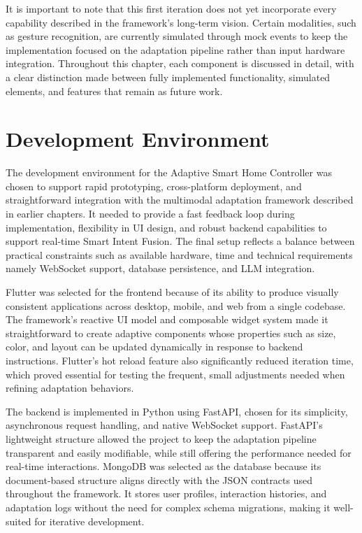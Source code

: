 \documentclass[openany]{book}
\begin{document}
It is important to note that this first iteration does not yet incorporate every capability described in the framework’s long-term vision. Certain modalities, such as gesture recognition, are currently simulated through mock events to keep the implementation focused on the adaptation pipeline rather than input hardware integration. Throughout this chapter, each component is discussed in detail, with a clear distinction made between fully implemented functionality, simulated elements, and features that remain as future work.

\section{Development Environment}
The development environment for the Adaptive Smart Home Controller was chosen to support rapid prototyping, cross-platform deployment, and straightforward integration with the multimodal adaptation framework described in earlier chapters. It needed to provide a fast feedback loop during implementation, flexibility in UI design, and robust backend capabilities to support real-time Smart Intent Fusion. The final setup reflects a balance between practical constraints such as available hardware, time and technical requirements namely WebSocket support, database persistence, and LLM integration.

Flutter was selected for the frontend because of its ability to produce visually consistent applications across desktop, mobile, and web from a single codebase. The framework’s reactive UI model and composable widget system made it straightforward to create adaptive components whose properties such as size, color, and layout can be updated dynamically in response to backend instructions. Flutter’s hot reload feature also significantly reduced iteration time, which proved essential for testing the frequent, small adjustments needed when refining adaptation behaviors.

The backend is implemented in Python using FastAPI, chosen for its simplicity, asynchronous request handling, and native WebSocket support. FastAPI’s lightweight structure allowed the project to keep the adaptation pipeline transparent and easily modifiable, while still offering the performance needed for real-time interactions. MongoDB was selected as the database because its document-based structure aligns directly with the JSON contracts used throughout the framework. It stores user profiles, interaction histories, and adaptation logs without the need for complex schema migrations, making it well-suited for iterative development.
\end{document}
